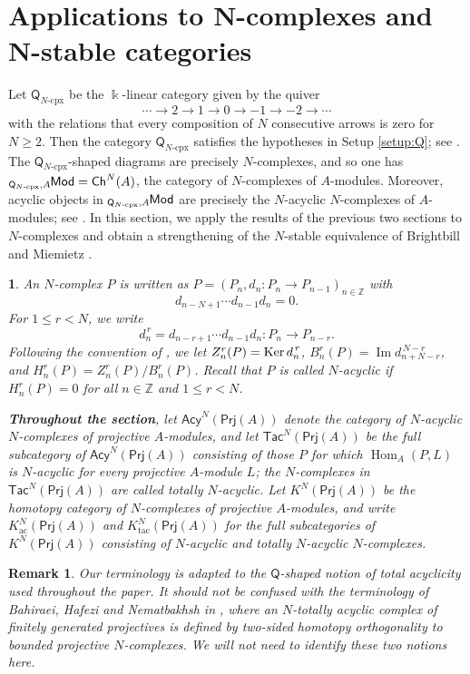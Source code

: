 \documentclass{amsart}
\theoremstyle{bfupright head,slanted body}
\theoremstyle{bfupright head,upright body}
\theoremstyle{fixed bf head,slanted body}
\theoremstyle{fixed bf head,upright body}
\newtheorem{rmk}[res]{Remark}           \newtheorem*{rmk*}{Remark}
\theoremstyle{numbered paragraph}
\newtheorem{ipg}[res]{}
\numberwithin{equation}{res}
\newcommand{\Prj}[1]{\mathsf{Prj}(#1)}
\newcommand{\Ker}[1]{\nobreak{\operatorname{Ker}#1}}
\newcommand{\Hom}{\operatorname{Hom}}
\newcommand{\Q}{\mathsf{Q}}
\newcommand{\kk}{\Bbbk}
\newcommand{\lMod}[1]{{}_{#1}\mspace{-1mu}{\sf{Mod}}}
\begin{document}
\section{Applications to N-complexes and N-stable categories}
\noindent
Let $\Q_{N\text{-}\mathrm{cpx}}$ be the $\kk$-linear category given by the quiver
$$\cdots\to 2\to 1\to 0\to -1\to -2\to\cdots$$
with the relations that every composition of $N$ consecutive arrows is zero for $N\geq2$. Then the category $\Q_{N\text{-}\mathrm{cpx}}$ satisfies the hypotheses in Setup \ref{setup:Q}; see \cite{HJ22}. The $\Q_{N\text{-}\mathrm{cpx}}$-shaped diagrams are precisely $N$-complexes, and so one has $\lMod{\Q_{N\text{-}\mathrm{cpx}},A}={\sf Ch}^N(A)$, the category of $N$-complexes of $A$-modules. Moreover, acyclic objects in $\lMod{\Q_{N\text{-}\mathrm{cpx}},A}$ are precisely the $N$-acyclic $N$-complexes of $A$-modules; see \cite[Section 3.5]{HJ24b}. In this section, we apply the results of the previous two sections to
$N$-complexes and obtain a strengthening of the $N$-stable equivalence of Brightbill and Miemietz \cite[Theorem 4.12]{BM24}.
\begin{ipg}
An $N$-complex $P$ is written as $P=(P_n,d_n:P_n\to P_{n-1})_{n\in\mathbb Z}$ with
$$d_{n-N+1}\cdots d_{n-1}d_n=0.$$
For $1\leq r<N$, we write
$$d_n^{\,r}=d_{n-r+1}\cdots d_{n-1}d_n: P_n\to P_{n-r}.$$
Following the convention of \cite{BM24}, we let $Z_n^r(P)=\Ker d_n^{\,r}$, $B_n^r(P)=\operatorname{Im}d_{n+N-r}^{\,N-r}$, and $H_n^r(P)=Z_n^r(P)/B_n^r(P)$. Recall that $P$ is called $N$-\emph{acyclic} if $H_n^r(P)=0$ for all $n\in\mathbb Z$ and $1\leq r<N$.

{\bf Throughout the section}, let $\mathsf{Acy}^N(\Prj A)$ denote the category of $N$-acyclic $N$-complexes of projective $A$-modules, and let $\mathsf{Tac}^N(\Prj A)$ be the full subcategory of $\mathsf{Acy}^N(\Prj A)$ consisting of those $P$ for which $\Hom_A(P,L)$ is $N$-acyclic for every projective $A$-module $L$; the $N$-complexes in $\mathsf{Tac}^N(\Prj A)$ are called \emph{totally $N$-acyclic}. Let $K^N(\Prj A)$ be the homotopy category of $N$-complexes of projective $A$-modules, and write $K^N_{\mathrm{ac}}(\Prj A)$ and $K^N_{\mathrm{tac}}(\Prj A)$ for the full subcategories of $K^N(\Prj A)$ consisting of $N$-acyclic and totally $N$-acyclic $N$-complexes.
\end{ipg}

\begin{rmk}\label{rmk:N-total-terminology}
Our terminology is adapted to the $\Q$-shaped notion of total acyclicity used throughout the paper. It should not be confused with the terminology of Bahiraei, Hafezi and Nematbakhsh in \cite[Section 4]{BHN16}, where an $N$-totally acyclic complex of finitely generated projectives is defined by two-sided homotopy orthogonality to bounded projective $N$-complexes. We will not need to identify these two notions here.
\end{rmk}
\end{document}
